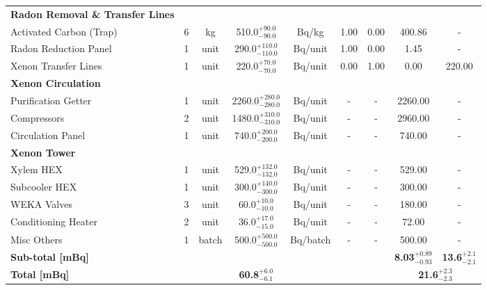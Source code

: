 \begin{table}[p!]
\begin{adjustbox}{width=\textwidth,center}
\begin{tabular}{lcc|cc|cc|cc}
        \hline
        \textbf{Radon Removal \& Transfer Lines} &  &  &  &  &  &  &  &  \\
        Activated Carbon (Trap) & 6 & kg & 510.0$^{+90.0}_{-90.0}$ & \micro{}Bq/kg & 1.00 &	0.00 & 400.86 & - \\
        Radon Reduction Panel &	1 & unit & 290.0$^{+110.0}_{-110.0}$ & \micro{}Bq/unit & 1.00 &	0.00 & 1.45 & - \\
        Xenon Transfer Lines & 1 & unit	& 220.0$^{+70.0}_{-70.0}$ &	\micro{}Bq/unit & 0.00 & 1.00 & 0.00 & 220.00 \\

        \hline
        \textbf{Xenon Circulation} &  &  &  &  &  &  &  &  \\
        Purification Getter & 1 & unit & 2260.0$^{+280.0}_{-280.0}$ & \micro{}Bq/unit &	- &	- & 2260.00 & - \\
        Compressors & 2 & unit & 1480.0$^{+310.0}_{-310.0}$ & \micro{}Bq/unit & - & - & 2960.00 & - \\
        Circulation Panel &	1 &	unit & 740.0$^{+200.0}_{-200.0}$ & \micro{}Bq/unit & - & - & 740.00 & - \\   
        
        \hline
        \textbf{Xenon Tower	} &  &  &  &  &  &  &  &  \\
        Xylem HEX &	1 & unit & 529.0$^{+132.0}_{-132.0}$ &	\micro{}Bq/unit & - & - & 529.00 & - \\   
        Subcooler HEX &	1 &	unit & 300.0$^{+140.0}_{-300.0}$ & \micro{}Bq/unit & - & - & 300.00 & - \\   
        WEKA Valves & 3 &	unit & 60.0$^{+10.0}_{-10.0}$ &	\micro{}Bq/unit & - & - & 180.00 & - \\   
        Conditioning Heater &	2 &	unit & 36.0$^{+17.0}_{-15.0}$ & \micro{}Bq/unit & - & - & 72.00 & - \\   
        Misc Others & 1 & batch & 500.0$^{+500.0}_{-500.0}$ & \micro{}Bq/batch & - & - & 500.00 & - \\   
        
        \hline
        \hline
        
        \textbf{Sub-total [mBq]} & & & & & & & \textbf{8.03$^{+0.89}_{-0.93}$} & \textbf{13.6$^{+2.1}_{-2.1}$} \\
        \textbf{Total [mBq]} & & & \textbf{60.8$^{+6.0}_{-6.1}$} &  & & & \multicolumn{2}{c}{\textbf{21.6$^{+2.3}_{-2.3}$}} \\
        
        \bottomrule
        \end{tabular}
    \end{adjustbox}
\end{table}